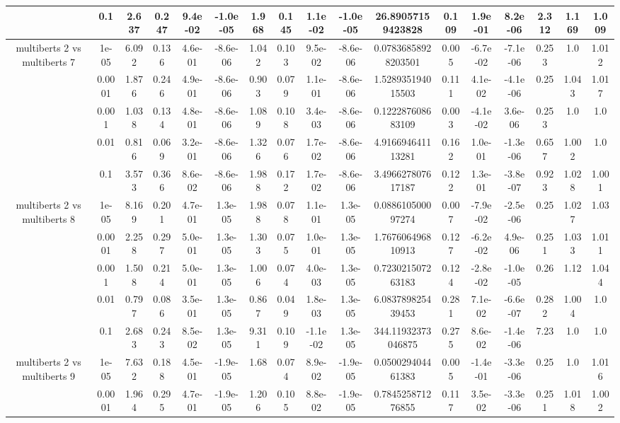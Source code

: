 \begin{tabular}{|c|c|c|c|c|c|c|c|c|c|c|c|c|c|c|c|c|}
 & 0.1 & 2.637 & 0.247 & 9.4e-02 & -1.0e-05 & 1.968 & 0.145 & 1.1e-02 & -1.0e-05 & 26.89057159423828 & 0.109 & 1.9e-01 & 8.2e-06 & 2.312 & 1.169 & 1.009 \\
\hline
\multirow{5}{*}{multiberts 2 vs multiberts 7} & 1e-05 & 6.092 & 0.136 & 4.6e-01 & -8.6e-06 & 1.042 & 0.103 & 9.5e-02 & -8.6e-06 & 0.07836858928203501 & 0.005 & -6.7e-02 & -7.1e-06 & 0.253 & 1.0 & 1.012 \\
 & 0.0001 & 1.876 & 0.246 & 4.9e-01 & -8.6e-06 & 0.903 & 0.079 & 1.1e-01 & -8.6e-06 & 1.528935194015503 & 0.111 & 4.1e-02 & -4.1e-06 & 0.25 & 1.043 & 1.017 \\
 & 0.001 & 1.038 & 0.134 & 4.8e-01 & -8.6e-06 & 1.089 & 0.108 & 3.4e-03 & -8.6e-06 & 0.122287608683109 & 0.003 & -4.1e-02 & 3.6e-06 & 0.253 & 1.0 & 1.0 \\
 & 0.01 & 0.816 & 0.069 & 3.2e-01 & -8.6e-06 & 1.326 & 0.076 & 1.7e-02 & -8.6e-06 & 4.916694641113281 & 0.162 & 1.0e-01 & -1.3e-06 & 0.657 & 1.002 & 1.0 \\
 & 0.1 & 3.573 & 0.366 & 8.6e-02 & -8.6e-06 & 1.988 & 0.172 & 1.7e-02 & -8.6e-06 & 3.496627807617187 & 0.122 & 1.3e-01 & -3.8e-07 & 0.923 & 1.028 & 1.001 \\
\hline
\multirow{5}{*}{multiberts 2 vs multiberts 8} & 1e-05 & 8.169 & 0.201 & 4.7e-01 & 1.3e-05 & 1.988 & 0.078 & 1.1e-01 & 1.3e-05 & 0.088610500097274 & 0.007 & -7.9e-02 & -2.5e-06 & 0.25 & 1.027 & 1.03 \\
 & 0.0001 & 2.258 & 0.297 & 5.0e-01 & 1.3e-05 & 1.303 & 0.075 & 1.0e-01 & 1.3e-05 & 1.767606496810913 & 0.127 & -6.2e-02 & 4.9e-06 & 0.251 & 1.033 & 1.011 \\
 & 0.001 & 1.508 & 0.214 & 5.0e-01 & 1.3e-05 & 1.006 & 0.074 & 4.0e-03 & 1.3e-05 & 0.723021507263183 & 0.124 & -2.8e-02 & -1.0e-05 & 0.26 & 1.12 & 1.044 \\
 & 0.01 & 0.797 & 0.086 & 3.5e-01 & 1.3e-05 & 0.867 & 0.049 & 1.8e-03 & 1.3e-05 & 6.083789825439453 & 0.281 & 7.1e-02 & -6.6e-07 & 0.282 & 1.004 & 1.0 \\
 & 0.1 & 2.683 & 0.243 & 8.5e-02 & 1.3e-05 & 9.311 & 0.109 & -1.1e-02 & 1.3e-05 & 344.11932373046875 & 0.275 & 8.6e-02 & -1.4e-06 & 7.23 & 1.0 & 1.0 \\
\hline
\multirow{5}{*}{multiberts 2 vs multiberts 9} & 1e-05 & 7.632 & 0.188 & 4.5e-01 & -1.9e-05 & 1.68 & 0.074 & 8.9e-02 & -1.9e-05 & 0.050029404461383 & 0.005 & -1.4e-01 & -3.3e-06 & 0.25 & 1.0 & 1.016 \\
 & 0.0001 & 1.964 & 0.295 & 4.7e-01 & -1.9e-05 & 1.206 & 0.105 & 8.8e-02 & -1.9e-05 & 0.784525871276855 & 0.117 & 3.5e-02 & -3.3e-06 & 0.251 & 1.018 & 1.002 \\

\end{tabular}
